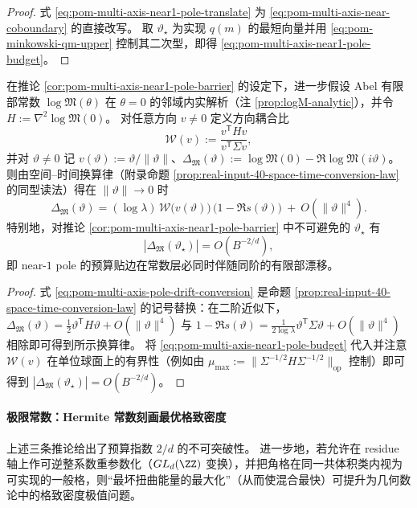 \begin{proof}
式 \eqref{eq:pom-multi-axis-near1-pole-translate} 为 \eqref{eq:pom-multi-axis-near-coboundary} 的直接改写。
取 \(\vartheta_\star\) 为实现 \(q(m)\) 的最短向量并用 \eqref{eq:pom-minkowski-qm-upper} 控制其二次型，即得 \eqref{eq:pom-multi-axis-near1-pole-budget}。
\end{proof}

\begin{corollary}\label{cor:pom-multi-axis-pole-drift-binding}
在推论 \ref{cor:pom-multi-axis-near1-pole-barrier} 的设定下，进一步假设 Abel 有限部常数 \(\log\mathfrak{M}(\theta)\) 在 \(\theta=0\) 的邻域内实解析（注 \ref{prop:logM-analytic}），并令
\(
H:=\nabla^2\log\mathfrak{M}(0)
\)。
对任意方向 \(v\neq 0\) 定义方向耦合比
\[
\mathcal{W}(v):=\frac{v^{\mathsf T}Hv}{v^{\mathsf T}\Sigma v},
\]
并对 \(\vartheta\neq 0\) 记 \(v(\vartheta):=\vartheta/\|\vartheta\|\)、\(\Delta_{\mathfrak{M}}(\vartheta):=\log\mathfrak{M}(0)-\Re\log\mathfrak{M}(i\vartheta)\)。
则由空间--时间换算律（附录命题 \ref{prop:real-input-40-space-time-conversion-law} 的同型读法）得在 \(\|\vartheta\|\to 0\) 时
\begin{equation}\label{eq:pom-multi-axis-pole-drift-conversion}
\Delta_{\mathfrak{M}}(\vartheta)
=(\log\lambda)\,\mathcal{W}\bigl(v(\vartheta)\bigr)\,\bigl(1-\Re s(\vartheta)\bigr)\ +\ O(\|\vartheta\|^4).
\end{equation}
特别地，对推论 \ref{cor:pom-multi-axis-near1-pole-barrier} 中不可避免的 \(\vartheta_\star\) 有
\[
|\Delta_{\mathfrak{M}}(\vartheta_\star)|=O(B^{-2/d}),
\]
即 near-\(1\) pole 的预算贴边在常数层必同时伴随同阶的有限部漂移。
\end{corollary}

\begin{proof}
式 \eqref{eq:pom-multi-axis-pole-drift-conversion} 是命题 \ref{prop:real-input-40-space-time-conversion-law} 的记号替换：在二阶近似下，
\(
\Delta_{\mathfrak{M}}(\vartheta)=\frac12\vartheta^{\mathsf T}H\vartheta+O(\|\vartheta\|^4)
\)
与
\(
1-\Re s(\vartheta)=\frac{1}{2\log\lambda}\vartheta^{\mathsf T}\Sigma\vartheta+O(\|\vartheta\|^4)
\)
相除即可得到所示换算律。
将 \eqref{eq:pom-multi-axis-near1-pole-budget} 代入并注意 \(\mathcal{W}(v)\) 在单位球面上的有界性（例如由 \(\mu_{\max}:=\|\Sigma^{-1/2}H\Sigma^{-1/2}\|_{\mathrm{op}}\) 控制）即可得到 \(|\Delta_{\mathfrak{M}}(\vartheta_\star)|=O(B^{-2/d})\)。
\end{proof}

\paragraph{极限常数：Hermite 常数刻画最优格致密度}
上述三条推论给出了预算指数 \(2/d\) 的不可突破性。
进一步地，若允许在 residue 轴上作可逆整系数重参数化（\(GL_d(\ZZ)\) 变换），并把角格在同一共体积类内视为可实现的一般格，则“最坏扭曲能量的最大化”（从而使混合最快）可提升为几何数论中的格致密度极值问题。


